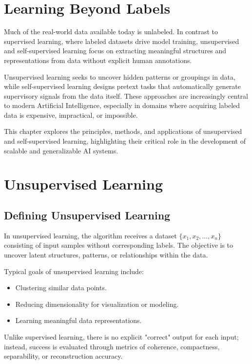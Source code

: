 \documentclass[openany]{book}
\begin{document}
\section{Learning Beyond Labels}
Much of the real-world data available today is unlabeled. In contrast to 
supervised learning, where labeled datasets drive model training, unsupervised 
and self-supervised learning focus on extracting meaningful structures and 
representations from data without explicit human annotations.

Unsupervised learning seeks to uncover hidden patterns or groupings in data, 
while self-supervised learning designs pretext tasks that automatically generate 
supervisory signals from the data itself. These approaches are increasingly 
central to modern Artificial Intelligence, especially in domains where acquiring 
labeled data is expensive, impractical, or impossible.

This chapter explores the principles, methods, and applications of unsupervised 
and self-supervised learning, highlighting their critical role in the 
development of scalable and generalizable AI systems.

\section{Unsupervised Learning}

\subsection{Defining Unsupervised Learning}
In unsupervised learning, the algorithm receives a dataset \( \{ x_1, x_2, 
\dots, x_n \} \) consisting of input samples without corresponding labels. The 
objective is to uncover latent structures, patterns, or relationships within 
the data.

Typical goals of unsupervised learning include:
\begin{itemize}
    \item Clustering similar data points.
    \item Reducing dimensionality for visualization or modeling.
    \item Learning meaningful data representations.
\end{itemize}

Unlike supervised learning, there is no explicit "correct" output for each 
input; instead, success is evaluated through metrics of coherence, compactness, 
separability, or reconstruction accuracy.
\end{document}
